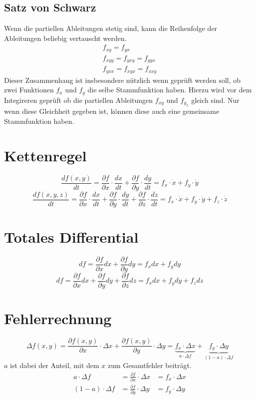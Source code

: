 \subsection{Satz von Schwarz}
Wenn die partiellen Ableitungen stetig sind, kann die Reihenfolge der 
Ableitungen beliebig vertauscht werden. 
\[ \boxed{\begin{array}{l}
f_{xy} = f_{yx} \\
f_{xyy} = f_{yxy} = f_{yyx} \\
f_{yxx} = f_{xyx} = f_{xxy} 
\end{array}} \]
Dieser Zusammenhang ist insbesondere nützlich wenn geprüft werden soll,
ob zwei Funktionen $f_x$ und $f_y$ die selbe Stammfunktion haben. Hierzu 
wird vor dem Integireren geprüft ob die partiellen Ableitungen
$f_{xy}$ und $f_{y_x}$ gleich sind. Nur wenn diese Gleichheit gegeben ist,
können diese auch eine gemeinsame Stammfunktion haben.


\section{Kettenregel}
\[ \boxed{\frac{d f(x,y)}{d t} 
= \frac{\partial f}{\partial x} \cdot \frac{d x}{d t} 
+ \frac{\partial f}{\partial y} \cdot \frac{d y}{d t} 
= f_x \cdot \dot{x} + f_y \cdot \dot{y}} \]
\[ \boxed{\frac{d f(x,y,z)}{d t} 
= \frac{\partial f}{\partial x} \cdot \frac{d x}{d t} 
+ \frac{\partial f}{\partial y} \cdot \frac{d y}{d t} 
+ \frac{\partial f}{\partial z} \cdot \frac{d z}{d t} 
= f_x \cdot \dot{x} + f_y \cdot \dot{y} + f_z \cdot \dot{z}} \]

\section{Totales Differential}
\[ \boxed{d f 
= \frac{\partial f}{\partial x} dx + \frac{\partial f}{\partial y} dy 
= f_x dx + f_y dy} \]
\[ \boxed{d f = \frac{\partial f}{\partial x} dx 
+ \frac{\partial f}{\partial y} dy + \frac{\partial f}{\partial z} dz 
= f_x dx + f_y dy + f_z dz} \]

\section{Fehlerrechnung}
\[ \boxed{\Delta f(x,y) = \frac{\partial f(x,y)}{\partial x} \cdot \Delta x 
+ \frac{\partial f(x,y)}{\partial y} \cdot \Delta y 
= \underbrace{f_x \cdot \Delta x}_{a \cdot \Delta f} 
+ \underbrace{f_y \cdot \Delta y}_{(1 - a) \cdot \Delta f}} \]
$a$ ist dabei der Anteil, mit dem $x$ zum Gesamtfehler beiträgt. 
\[ \boxed{\begin{array}{rll}
a \cdot \Delta f        &= \frac{\partial f}{\partial x} \cdot \Delta x 
&= f_x \cdot \Delta x \\
(1 - a) \cdot \Delta f  &= \frac{\partial f}{\partial y} \cdot \Delta y 
&= f_y \cdot \Delta y \\
\end{array}} \]

